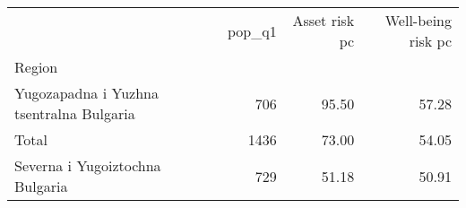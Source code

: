 \begin{tabular}{lrrr}
\toprule
{} &  pop\_q1 &  Asset risk pc &  Well-being risk pc \\
Region                                   &         &                &                     \\
\midrule
Yugozapadna i Yuzhna tsentralna Bulgaria &     706 &          95.50 &               57.28 \\
Total                                    &    1436 &          73.00 &               54.05 \\
Severna i Yugoiztochna Bulgaria          &     729 &          51.18 &               50.91 \\
\bottomrule
\end{tabular}

